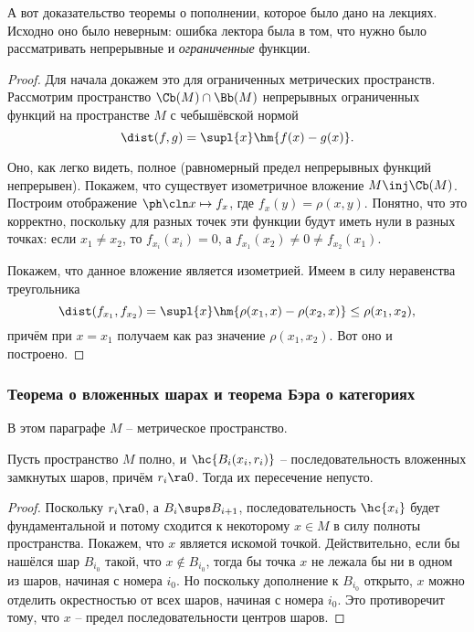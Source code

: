 \documentclass[a4paper]{article}
\begin{document}
\begin{petit}
А вот доказательство теоремы о пополнении, которое было дано на лекциях. Исходно оно было неверным:
ошибка лектора была в том, что нужно было рассматривать непрерывные и \emph{ограниченные} функции.

\begin{proof}
Для начала докажем это для ограниченных метрических пространств.
Рассмотрим пространство $\Cb(M)\cap \Bb(M)$ непрерывных ограниченных функций на пространстве $M$
с чебышёвской нормой
$$\dist(f,g) = \supl{x} \hm{f(x) - g(x)}.$$

Оно, как легко видеть, полное (равномерный предел непрерывных функций непрерывен). Покажем, что
существует изометричное вложение $M \inj \Cb(M)$. Построим отображение $\ph\cln x \mapsto f_x$,
где $f_x(y) = \rho(x, y)$. Понятно, что это корректно,
поскольку для разных точек эти функции будут иметь нули в разных точках:
если $x_1 \neq x_2$, то $f_{x_i}(x_i) = 0$, а $f_{x_1}(x_2) \neq 0 \neq f_{x_2}(x_1)$.

Покажем, что данное вложение является изометрией. Имеем в силу неравенства треугольника
$$
  \dist(f_{x_1}, f_{x_2}) = \supl{x} \hm{\rho(x_1,x) - \rho(x_2,x)} \le \rho(x_1,x_2),
$$
причём при $x = x_1$ получаем как раз значение $\rho(x_1,x_2)$.
Вот оно и построено.
\end{proof}
\end{petit}

\subsubsection{Теорема о вложенных шарах и теорема Бэра о категориях}

В этом параграфе $M$ -- метрическое пространство.

\begin{theorem}
Пусть пространство $M$ полно, и $\hc{B_i(x_i, r_i)}$ -- последовательность вложенных
замкнутых шаров, причём $r_i \ra 0$. Тогда их пересечение непусто.
\end{theorem}
\begin{proof}
Поскольку $r_i \ra 0$, а $B_i \sups B_{i+1}$, последовательность $\hc{x_i}$ будет
фундаментальной и потому сходится
к некоторому $x \in M$ в силу полноты пространства. Покажем, что $x$ является искомой точкой.
Действительно, если бы нашёлся шар $B_{i_0}$ такой, что $x \notin B_{i_0}$, тогда бы
точка $x$ не лежала бы ни в одном из шаров, начиная с номера $i_0$. Но поскольку дополнение к $B_{i_0}$
открыто, $x$ можно отделить окрестностью от всех шаров, начиная с номера $i_0$. Это противоречит тому,
что $x$ -- предел последовательности центров шаров.
\end{proof}
\end{document}
